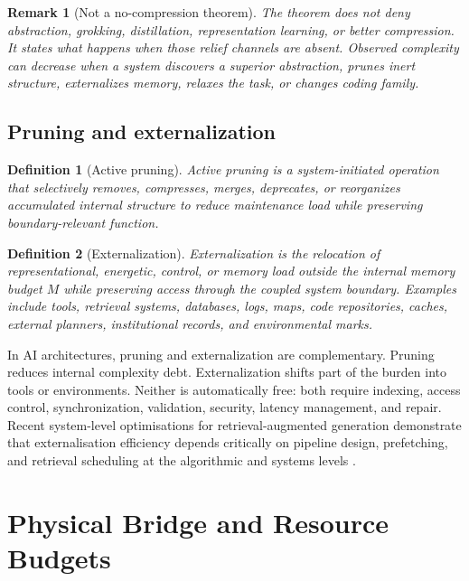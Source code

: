 \documentclass[10pt,a4paper,twocolumn,aps,prl]{revtex4-2}
\newtheorem{definition}{Definition}
\newtheorem{remark}{Remark}
\begin{document}
\begin{remark}[Not a no-compression theorem]
The theorem does not deny abstraction, grokking, distillation, representation learning, or better compression. It states what happens when those relief channels are absent. Observed complexity can decrease when a system discovers a superior abstraction, prunes inert structure, externalizes memory, relaxes the task, or changes coding family.
\end{remark}

\subsection{Pruning and externalization}

\begin{definition}[Active pruning]
Active pruning is a system-initiated operation that selectively removes, compresses, merges, deprecates, or reorganizes accumulated internal structure to reduce maintenance load while preserving boundary-relevant function.
\end{definition}

\begin{definition}[Externalization]
Externalization is the relocation of representational, energetic, control, or memory load outside the internal memory budget $M$ while preserving access through the coupled system boundary. Examples include tools, retrieval systems, databases, logs, maps, code repositories, caches, external planners, institutional records, and environmental marks.
\end{definition}

In AI architectures, pruning and externalization are complementary. Pruning reduces internal complexity debt. Externalization shifts part of the burden into tools or environments. Neither is automatically free: both require indexing, access control, synchronization, validation, security, latency management, and repair. Recent system-level optimisations for retrieval-augmented generation demonstrate that externalisation efficiency depends critically on pipeline design, prefetching, and retrieval scheduling at the algorithmic and systems levels \cite{jiang2025piperag,lin2025telerag}.

\section{Physical Bridge and Resource Budgets}
\end{document}
